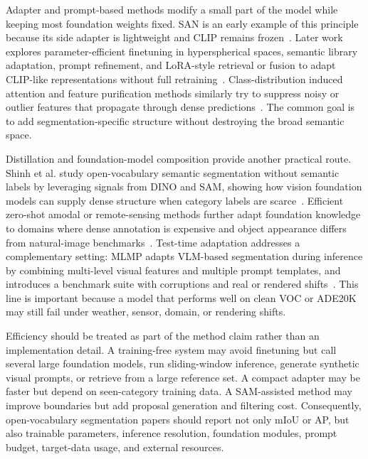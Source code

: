 Adapter and prompt-based methods modify a small part of the model while keeping most foundation weights fixed. SAN is an early example of this principle because its side adapter is lightweight and CLIP remains frozen~\citep{xu2023san}. Later work explores parameter-efficient finetuning in hyperspherical spaces, semantic library adaptation, prompt refinement, and LoRA-style retrieval or fusion to adapt CLIP-like representations without full retraining~\citep{zpengParameterefficientFinetuningHyperspherical2025,rqorbaniSemanticLibraryAdaptation2025}. Class-distribution induced attention and feature purification methods similarly try to suppress noisy or outlier features that propagate through dense predictions~\citep{dukangClassDistributioninducedAttention2025,sjinFeaturePurificationMatters2025,qchenTrainingFreeClassPurification2025}. The common goal is to add segmentation-specific structure without destroying the broad semantic space.

Distillation and foundation-model composition provide another practical route. Shinh et al. study open-vocabulary semantic segmentation without semantic labels by leveraging signals from DINO and SAM, showing how vision foundation models can supply dense structure when category labels are scarce~\citep{shinhOpenvocabularySemanticSegmentation2024}. Efficient zero-shot amodal or remote-sensing methods further adapt foundation knowledge to domains where dense annotation is expensive and object appearance differs from natural-image benchmarks~\citep{liuEfficientFoundationModel2025,libExploringEfficientOpenvocabulary2026}. Test-time adaptation addresses a complementary setting: MLMP adapts VLM-based segmentation during inference by combining multi-level visual features and multiple prompt templates, and introduces a benchmark suite with corruptions and real or rendered shifts~\citep{noorimTesttimeAdaptationVisionlanguage2026}. This line is important because a model that performs well on clean VOC or ADE20K may still fail under weather, sensor, domain, or rendering shifts.

Efficiency should be treated as part of the method claim rather than an implementation detail. A training-free system may avoid finetuning but call several large foundation models, run sliding-window inference, generate synthetic visual prompts, or retrieve from a large reference set. A compact adapter may be faster but depend on seen-category training data. A SAM-assisted method may improve boundaries but add proposal generation and filtering cost. Consequently, open-vocabulary segmentation papers should report not only mIoU or AP, but also trainable parameters, inference resolution, foundation modules, prompt budget, target-data usage, and external resources.

